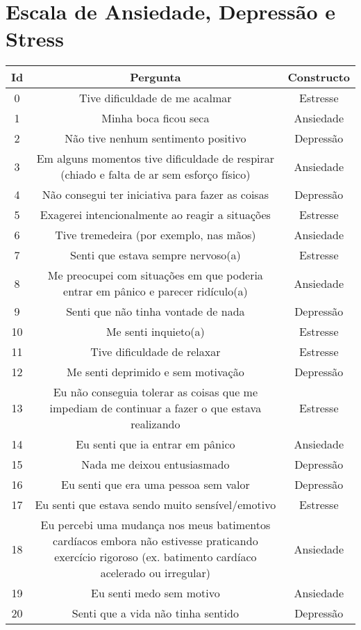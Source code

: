 \chapter{Escala de Ansiedade, Depressão e Stress}
\label{app:eads}

\begin{table}[]
\begin{tabular}{c|c|c}
\textbf{Id} & \textbf{Pergunta} & \textbf{Constructo} \\ \hline
0 & Tive dificuldade de me acalmar & Estresse \\
1 & Minha boca ficou seca & Ansiedade \\
2 & Não tive nenhum sentimento positivo & Depressão \\
3 & Em alguns momentos tive dificuldade de respirar (chiado e falta de ar sem esforço físico) & Ansiedade \\
4 & Não consegui ter iniciativa para fazer as coisas & Depressão \\
5 & Exagerei intencionalmente ao reagir a situações & Estresse \\
6 & Tive tremedeira (por exemplo, nas mãos) & Ansiedade \\
7 & Senti que estava sempre nervoso(a) & Estresse \\
8 & Me preocupei com situações em que poderia entrar em pânico e parecer ridículo(a) & Ansiedade \\
9 & Senti que não tinha vontade de nada & Depressão \\
10 & Me senti inquieto(a) & Estresse \\
11 & Tive dificuldade de relaxar & Estresse \\
12 & Me senti deprimido e sem motivação & Depressão \\
13 & Eu não conseguia tolerar as coisas que me impediam de continuar a fazer o que estava realizando & Estresse \\
14 & Eu senti que ia entrar em pânico & Ansiedade \\
15 & Nada me deixou entusiasmado & Depressão \\
16 & Eu senti que era uma pessoa sem valor & Depressão \\
17 & Eu senti que estava sendo muito sensível/emotivo & Estresse \\
18 & Eu percebi uma mudança nos meus batimentos cardíacos embora não estivesse praticando exercício rigoroso (ex. batimento cardíaco acelerado ou irregular) & Ansiedade \\
19 & Eu senti medo sem motivo & Ansiedade \\
20 & Senti que a vida não tinha sentido & Depressão \\
\end{tabular}
\end{table}
